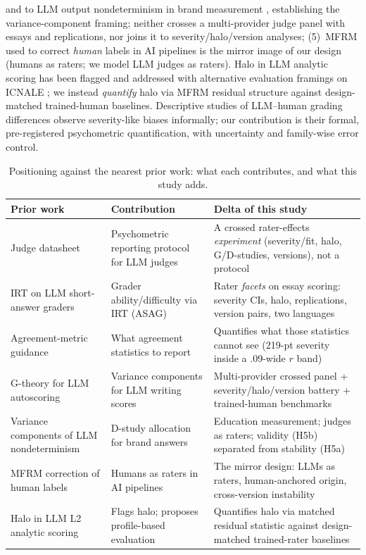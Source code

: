 \documentclass[fleqn,10pt]{JLA_article}
\begin{document}
\cite{gtheoryap2025} and to LLM output nondeterminism in brand measurement \cite{brandvar2026},
establishing the variance-component framing; neither crosses a multi-provider judge panel with
essays and replications, nor joins it to severity/halo/version analyses;
(5)~MFRM used to correct \emph{human} labels in AI pipelines \cite{humanmfrm2026} is the mirror
image of our design (humans as raters; we model LLM judges as raters). Halo in LLM analytic
scoring has been flagged and addressed with alternative evaluation framings on ICNALE
\cite{selfref2026}; we instead \emph{quantify} halo via MFRM residual structure against
design-matched trained-human baselines. Descriptive studies of LLM--human grading differences
\cite{llmnothuman2026} observe severity-like biases informally; our contribution is their formal,
pre-registered psychometric quantification, with uncertainty and family-wise error control.


\begin{table}[t]\centering
\caption{Positioning against the nearest prior work: what each contributes, and what this study adds.}
\label{tab:delta}\scriptsize
\begin{tabular}{p{4.6cm}p{5.2cm}p{5.6cm}}\toprule
Prior work & Contribution & Delta of this study \\ \midrule
Judge datasheet \cite{judgedatasheet2026} & Psychometric reporting protocol for LLM judges & A crossed rater-effects \emph{experiment} (severity/fit, halo, G/D-studies, versions), not a protocol \\
IRT on LLM short-answer graders \cite{irtasag2026} & Grader ability/difficulty via IRT (ASAG) & Rater \emph{facets} on essay scoring: severity CIs, halo, replications, version pairs, two languages \\
Agreement-metric guidance \cite{agreementmetrics2026} & What agreement statistics to report & Quantifies what those statistics cannot see (219-pt severity inside a .09-wide $r$ band) \\
G-theory for LLM autoscoring \cite{gtheoryap2025} & Variance components for LLM writing scores & Multi-provider crossed panel + severity/halo/version battery + trained-human benchmarks \\
Variance components of LLM nondeterminism \cite{brandvar2026} & D-study allocation for brand answers & Education measurement; judges as raters; validity (H5b) separated from stability (H5a) \\
MFRM correction of human labels \cite{humanmfrm2026} & Humans as raters in AI pipelines & The mirror design: LLMs as raters, human-anchored origin, cross-version instability \\
Halo in LLM L2 analytic scoring \cite{selfref2026} & Flags halo; proposes profile-based evaluation & Quantifies halo via matched residual statistic against design-matched trained-rater baselines \\
\bottomrule\end{tabular}\end{table}
\end{document}
